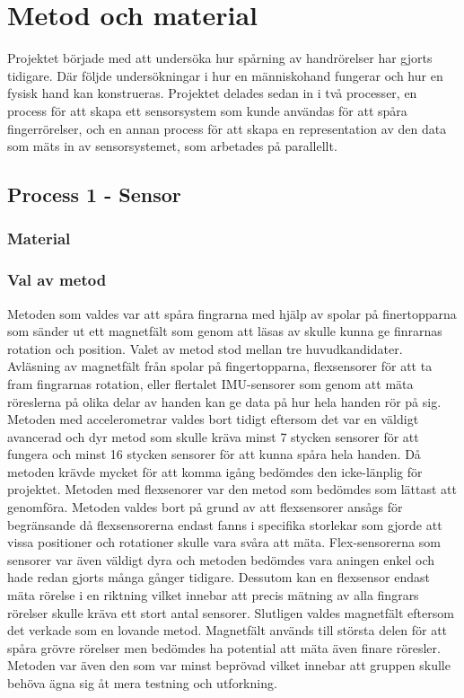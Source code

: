 \documentclass[a4paper]{article}
\begin{document}
\begin{sloppypar}
    \section{Metod och material}


    Projektet började med att undersöka hur spårning av handrörelser har gjorts tidigare. 
    Där följde undersökningar i hur en människohand fungerar och hur en fysisk hand kan konstrueras. 
    Projektet delades sedan in i två processer, en process för att skapa ett sensorsystem som kunde användas för att spåra fingerrörelser, 
    och en annan process för att skapa en representation av den data som mäts in av sensorsystemet, som arbetades på parallellt.

    \subsection{Process 1 - Sensor}

    \subsubsection{Material}

    \subsubsection{Val av metod}
    Metoden som valdes var att spåra fingrarna med hjälp av spolar på finertopparna som
    sänder ut ett magnetfält som genom att läsas av skulle kunna ge finrarnas rotation
    och position. Valet av metod stod mellan tre huvudkandidater. Avläsning av magnetfält
    från spolar på fingertopparna, flexsensorer för att ta fram fingrarnas rotation, eller
    flertalet IMU-sensorer som genom att mäta röreslerna på olika delar av handen kan
    ge data på hur hela handen rör på sig.
    Metoden med accelerometrar valdes bort tidigt eftersom det var en väldigt avancerad och
    dyr metod som skulle kräva minst 7 stycken sensorer för att fungera och minst 16 stycken
    sensorer för att kunna spåra hela handen. Då metoden krävde mycket för att komma
    igång bedömdes den icke-länplig för projektet.
    Metoden med flexsenorer var den metod som bedömdes som lättast att genomföra. Metoden
    valdes bort på grund av att flexsensorer ansågs för begränsande då flexsensorerna
    endast fanns i specifika storlekar som gjorde att vissa positioner och rotationer
    skulle vara svåra att mäta. Flex-sensorerna som sensorer var även väldigt dyra och
    metoden bedömdes vara aningen enkel och hade redan gjorts många gånger tidigare.
    Dessutom kan en flexsensor endast mäta rörelse i en riktning vilket innebar att
    precis mätning av alla fingrars rörelser skulle kräva ett stort antal sensorer.
    Slutligen valdes magnetfält eftersom det verkade som en lovande metod. Magnetfält
    används till största delen för att spåra grövre rörelser men bedömdes ha potential
    att mäta även finare röresler. Metoden var även den som var minst beprövad vilket
    innebar att gruppen skulle behöva ägna sig åt mera testning och utforkning.



\end{sloppypar}
\end{document}
